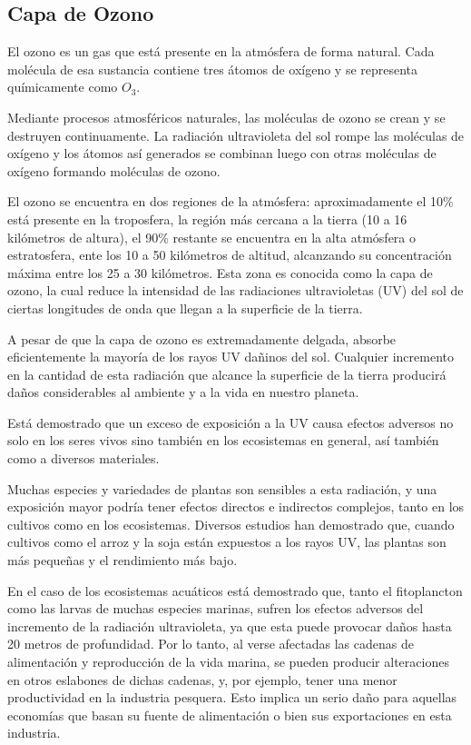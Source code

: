 	\subsection{Capa de Ozono}

	El ozono es un gas que está presente en la atmósfera de forma natural. Cada molécula de esa sustancia contiene tres átomos de oxígeno y se representa químicamente como $O_3$.

	Mediante procesos atmosféricos naturales, las moléculas de ozono se crean y se destruyen continuamente. La radiación ultravioleta del sol rompe las moléculas de oxígeno y los átomos así generados se combinan luego con otras moléculas de oxígeno formando moléculas de ozono.

	El ozono se encuentra en dos regiones de la atmósfera: aproximadamente el 10\% está presente en la troposfera, la región más cercana a la tierra (10 a 16 kilómetros de altura), el 90\% restante se encuentra en la alta atmósfera o estratosfera, ente los 10 a 50 kilómetros de altitud, alcanzando su concentración máxima entre los 25 a 30 kilómetros. Esta zona es conocida como la capa de ozono, la cual reduce la intensidad de las radiaciones ultravioletas (UV) del sol de ciertas longitudes de onda que llegan a la superficie de la tierra.

	A pesar de que la capa de ozono es extremadamente delgada, absorbe eficientemente la mayoría de los rayos UV dañinos del sol. Cualquier incremento en la cantidad de esta radiación que alcance la superficie de la tierra producirá daños considerables al ambiente y a la vida en nuestro planeta.

	Está demostrado que un exceso de exposición a la UV causa efectos adversos no solo en los seres vivos sino también en los ecosistemas en general, así también como a diversos materiales.

	Muchas especies y variedades de plantas son sensibles a esta radiación, y una exposición mayor podría tener efectos directos e indirectos complejos, tanto en los cultivos como en los ecosistemas. Diversos estudios han demostrado que, cuando cultivos como el arroz y la soja están expuestos a los rayos UV, las plantas son más pequeñas y el rendimiento más bajo.

	En el caso de los ecosistemas acuáticos está demostrado que, tanto el fitoplancton como las larvas de muchas especies marinas, sufren los efectos adversos del incremento de la radiación ultravioleta, ya que esta puede provocar daños hasta 20 metros de profundidad. Por lo tanto, al verse afectadas las cadenas de alimentación y reproducción de la vida marina, se pueden producir alteraciones en otros eslabones de dichas cadenas, y, por ejemplo, tener una menor productividad en la industria pesquera. Esto implica un serio daño para aquellas economías que basan su fuente de alimentación o bien sus exportaciones en esta industria.

